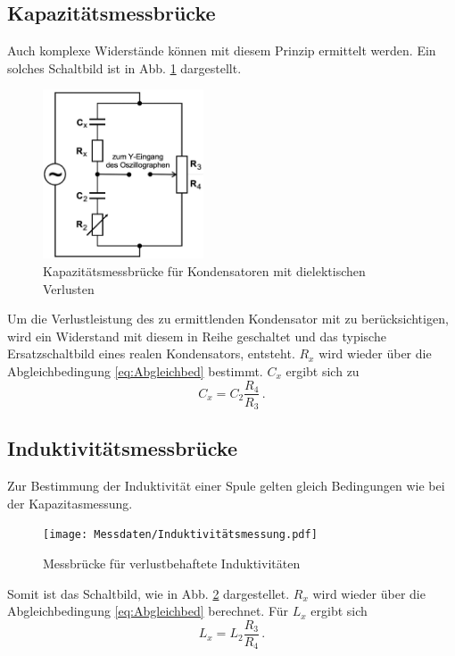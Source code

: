     \subsection{Kapazitätsmessbrücke}
    Auch komplexe Widerstände können mit diesem Prinzip ermittelt werden.
    Ein solches Schaltbild ist in Abb. \ref{fig:Kapatitaetsmessbruecke} dargestellt.
    \begin{figure}
        \centering
        \includegraphics[height= 5cm]{Messdaten/Kapazitaetsmessung.pdf}
        \caption{Kapazitätsmessbrücke für Kondensatoren mit dielektischen Verlusten}
        \label{fig:Kapatitaetsmessbruecke}
    \end{figure}
    Um die Verlustleistung des zu ermittlenden Kondensator mit zu berücksichtigen, wird ein Widerstand mit diesem in Reihe geschaltet
    und das typische Ersatzschaltbild eines realen Kondensators, entsteht.
    $R_x$ wird wieder über die Abgleichbedingung \ref{eq:Abgleichbed} bestimmt.
    $C_x$ ergibt sich zu
    \begin{equation*}
         C_x = C_2 \frac{R_4}{R_3} \, \text{.}
    \end{equation*}
    \subsection{Induktivitätsmessbrücke}
    Zur Bestimmung der Induktivität einer Spule gelten gleich Bedingungen wie bei der Kapazitasmessung.
    \begin{figure}
        \centering
        \texttt{[image: Messdaten/Induktivitätsmessung.pdf]}
        \caption{Messbrücke für verlustbehaftete Induktivitäten}
        \label{fig:Induktivitaetsmessbruecke}
    \end{figure}
    Somit ist das Schaltbild, wie in Abb. \ref{fig:Induktivitaetsmessbruecke} dargestellet.
    $R_x$ wird wieder über die Abgleichbedingung \eqref{eq:Abgleichbed} berechnet.
    Für $L_x$ ergibt sich
    \begin{equation*}
        L_x = L_2 \frac{R_3}{R_4}\, \text{.}
    \end{equation*}
